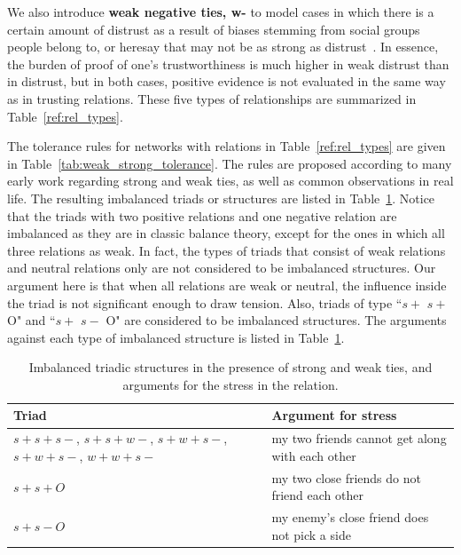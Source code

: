 {We also introduce {\bf weak negative ties, w- } to
model cases in which there is a certain amount of distrust as a result
of biases stemming from social groups people belong to, or heresay that
may not be as strong as distrust~\cite{Ames:2011}. In essence, the
burden of proof of one's trustworthiness is much higher in weak distrust
than in distrust, but in both cases, positive evidence is not
evaluated in the same way as in trusting relations. These five types
of relationships are summarized in Table~\ref{ref:rel_types}.

The tolerance rules for networks with relations in Table~\ref{ref:rel_types} are given in Table~\ref{tab:weak_strong_tolerance}. The rules are proposed according to many early work regarding strong and weak ties, as well as common observations in real life. The
resulting imbalanced triads or structures are listed in Table~\ref{tab:imbalanced_extended}. Notice that the triads with
two positive relations and one negative relation are imbalanced as
they are in classic balance theory, except for the ones in which all
three relations as weak. In fact, the types of triads that consist
of weak relations and neutral relations only are not considered to be
imbalanced structures. Our argument here is that when all relations
are weak or neutral, the influence inside the triad is not significant
enough to draw tension. Also, triads of type ``$s+$ $s+$ O" and
``$s+$ $s-$ O" are considered to be imbalanced structures. The
arguments against each type of imbalanced structure is listed in
Table~\ref{tab:imbalanced_extended}.

\begin{table}[htbp!]
\begin{center}
\caption{\label{tab:imbalanced_extended}Imbalanced triadic structures
  in the presence of strong and weak ties, and arguments
  for the stress in the relation.} 
 \begin{tabular}{p{1.8in} p{0.2in} p{2.8in}}
Triad & &Argument for stress \\ \hline

$s+ s+ s-$, $s+ s+ w-$, $s+ w+ s-$, $s+ w+ s-$, $w+ w+ s-$ & &
my two friends cannot get along with each other \\
$s+ s+ O$ & & my two close friends do not friend each other \\ 
$s+ s- O$ & & my enemy's close friend does not pick a side\\ 
\end{tabular} \vspace{4mm}
\end{center}
\end{table}
\vspace*{-0.2in}

}
